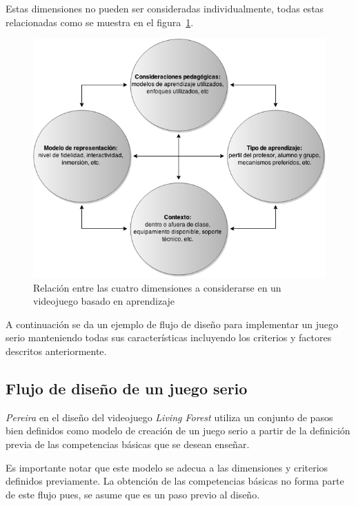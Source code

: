 Estas dimensiones no pueden ser consideradas individualmente, todas estas
relacionadas  como se muestra en el figura~\ref{fig:desarrollo_dimensiones}.

\begin{figure}[H]
\centering
\includegraphics[scale=0.5]{juegos_serios/desarrollo_dimensiones.png}
\caption{Relación entre las cuatro dimensiones a considerarse en un videojuego
    basado en aprendizaje}
\label{fig:desarrollo_dimensiones}
\end{figure}

A continuación se da un ejemplo de flujo de diseño para implementar un juego serio 
manteniendo todas sus características incluyendo los criterios y factores descritos 
anteriormente.

\subsection{Flujo de diseño de un juego serio}

\textit{Pereira}\cite{pereira2009design} en el diseño del videojuego \emph{Living
    Forest} utiliza un conjunto de pasos bien definidos como modelo de creación
de un juego serio a partir de la definición previa de las competencias básicas
que se desean enseñar.

Es importante notar que este modelo se adecua a las dimensiones y criterios
definidos previamente. La obtención de las competencias básicas no forma parte
de este flujo pues, se asume que es un paso previo al diseño.

